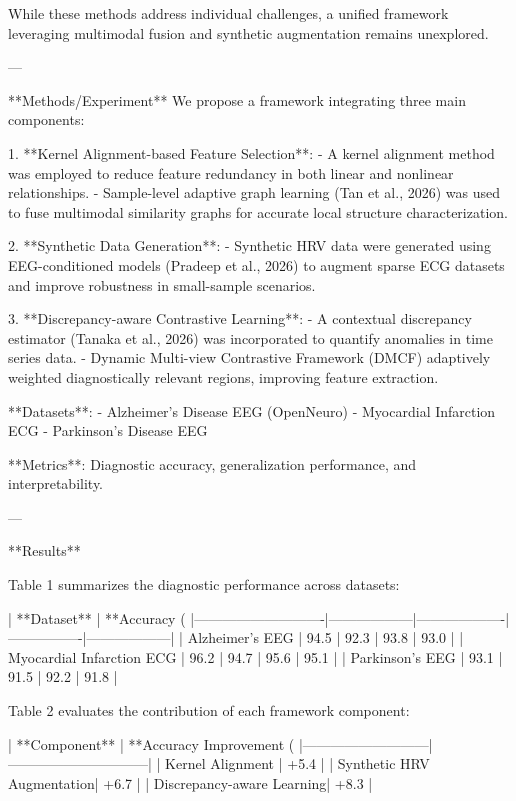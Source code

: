 While these methods address individual challenges, a unified framework leveraging multimodal fusion and synthetic augmentation remains unexplored.

---

**Methods/Experiment**  
We propose a framework integrating three main components:  

1. **Kernel Alignment-based Feature Selection**:  
   - A kernel alignment method was employed to reduce feature redundancy in both linear and nonlinear relationships.  
   - Sample-level adaptive graph learning (Tan et al., 2026) was used to fuse multimodal similarity graphs for accurate local structure characterization.

2. **Synthetic Data Generation**:  
   - Synthetic HRV data were generated using EEG-conditioned models (Pradeep et al., 2026) to augment sparse ECG datasets and improve robustness in small-sample scenarios.

3. **Discrepancy-aware Contrastive Learning**:  
   - A contextual discrepancy estimator (Tanaka et al., 2026) was incorporated to quantify anomalies in time series data.  
   - Dynamic Multi-view Contrastive Framework (DMCF) adaptively weighted diagnostically relevant regions, improving feature extraction.

**Datasets**:  
- Alzheimer's Disease EEG (OpenNeuro)  
- Myocardial Infarction ECG  
- Parkinson's Disease EEG  

**Metrics**: Diagnostic accuracy, generalization performance, and interpretability.  

---

**Results**  

Table 1 summarizes the diagnostic performance across datasets:  

| **Dataset**               | **Accuracy (%
|----------------------------|------------------|-------------------|----------------|------------------|  
| Alzheimer's EEG           | 94.5             | 92.3              | 93.8           | 93.0             |  
| Myocardial Infarction ECG | 96.2             | 94.7              | 95.6           | 95.1             |  
| Parkinson's EEG           | 93.1             | 91.5              | 92.2           | 91.8             |  

Table 2 evaluates the contribution of each framework component:

| **Component**             | **Accuracy Improvement (%
|---------------------------|------------------------------|  
| Kernel Alignment          | +5.4                        |  
| Synthetic HRV Augmentation| +6.7                        |  
| Discrepancy-aware Learning| +8.3                        |  

